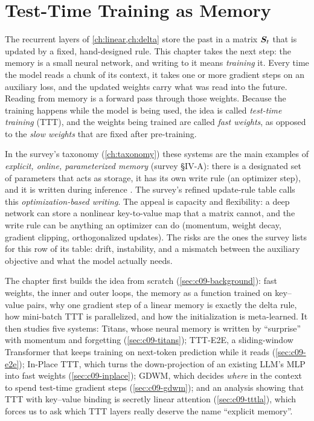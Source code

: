 \chapter{Test-Time Training as Memory}\label{ch:ttt}

The recurrent layers of \cref{ch:linear,ch:delta} store the past in a matrix $\bm{S}_t$ that is
updated by a fixed, hand-designed rule. This chapter takes the next step: the memory is a
small neural network, and writing to it means \emph{training} it. Every time the model reads
a chunk of its context, it takes one or more gradient steps on an auxiliary loss, and the
updated weights carry what was read into the future. Reading from memory is a forward pass
through those weights. Because the training happens while the model is being used, the idea
is called \emph{test-time training} (TTT), and the weights being trained are called
\emph{fast weights}, as opposed to the \emph{slow weights} that are fixed after pre-training.

In the survey's taxonomy (\cref{ch:taxonomy}) these systems are the main examples of
\emph{explicit, online, parameterized memory} (survey \S IV-A): there is a designated set of
parameters that acts as storage, it has its own write rule (an optimizer step), and it is
written during inference \citep{zhoubian2026memory}. The survey's refined update-rule table
calls this \emph{optimization-based writing}. The appeal is capacity and flexibility: a
deep network can store a nonlinear key-to-value map that a matrix cannot, and the write rule
can be anything an optimizer can do (momentum, weight decay, gradient clipping, orthogonalized
updates). The risks are the ones the survey lists for this row of its table: drift,
instability, and a mismatch between the auxiliary objective and what the model actually needs.

The chapter first builds the idea from scratch (\cref{sec:c09-background}): fast weights, the
inner and outer loops, the memory as a function trained on key--value pairs, why one gradient
step of a linear memory is exactly the delta rule, how mini-batch TTT is parallelized, and how
the initialization is meta-learned. It then studies five systems: Titans, whose neural memory
is written by ``surprise'' with momentum and forgetting (\cref{sec:c09-titans}); TTT-E2E, a
sliding-window Transformer that keeps training on next-token prediction while it reads
(\cref{sec:c09-e2e}); In-Place TTT, which turns the down-projection of an existing LLM's MLP
into fast weights (\cref{sec:c09-inplace}); GDWM, which decides \emph{where} in the context to
spend test-time gradient steps (\cref{sec:c09-gdwm}); and an analysis showing that TTT with
key--value binding is secretly linear attention (\cref{sec:c09-tttla}), which forces us to ask
which TTT layers really deserve the name ``explicit memory''.

